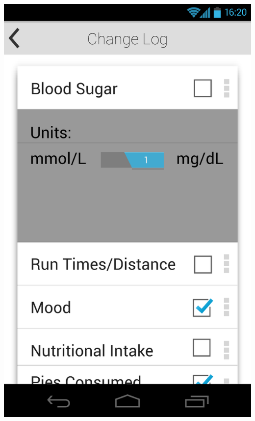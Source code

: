 \documentclass[pdftex,12pt,a4paper]{report}
\begin{document}
\begin{center}
	\includegraphics[scale=0.18]{Screens/05-Change-Log--Indi-Settings.png}

\end{center}
\end{document}
